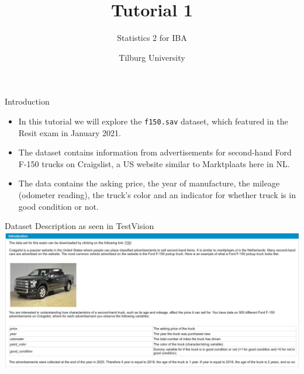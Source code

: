\documentclass[11pt]{beamer}
\title[Tutorial 1]{Tutorial 1}
\author{Statistics 2 for IBA}
\date{Tilburg University}
\begin{document}
\begin{frame}[plain]
  \titlepage
\end{frame}

\begin{frame}{Introduction}
  \begin{itemize}
    \item In this tutorial we will explore the \texttt{f150.sav} dataset, which featured in the Resit exam in January 2021.
    \item The dataset contains information from advertisements for second-hand Ford F-150 trucks on Craigslist, a US website similar to Marktplaats here in NL.
    \item The data contains the asking price, the year of manufacture, the mileage (odometer reading), the truck's color and an indicator for whether truck is in good condition or not.
  \end{itemize}
\end{frame}


\begin{frame}{Dataset Description as seen in TestVision}
  \includegraphics[width=\textwidth]{f150-exam-intro.png}
\end{frame}
\end{document}
